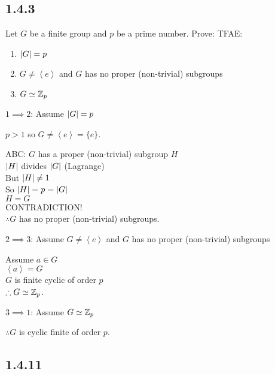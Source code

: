 \documentclass[letterpaper,12pt,fleqn]{article}
\newcommand{\cycle}[1]{\left<#1\right>}
\begin{document}
\subsection*{1.4.3}
Let $G$ be a finite group and $p$ be a prime number.
Prove: TFAE:
\begin{enumerate}
\item $\lvert G\rvert=p$
\item $G\ne\cycle{e}$ and $G$ has no proper (non-trivial) subgroups
\item $G\simeq\mathbb{Z}_p$
\end{enumerate}

\bigskip

\begin{description}
\item{$1\implies2$}: Assume $\lvert G\rvert=p$

  $p>1$ so $G\ne\cycle{e}=\{e\}$.

  ABC: $G$ has a proper (non-trivial) subgroup $H$ \\
  $\lvert H\rvert$ divides $\lvert G\rvert$ (Lagrange) \\
  But $\lvert H\rvert\ne1$ \\
  So $\lvert H\rvert=p=\lvert G\rvert$ \\
  $H=G$ \\
  CONTRADICTION! \\
  $\therefore G$ has no proper (non-trivial) subgroups.

\item{$2\implies3$}: Assume $G\ne\cycle{e}$ and $G$ has no proper
  (non-trivial) subgroups

  Assume $a\in G$ \\
  $\cycle{a}=G$ \\
  $G$ is finite cyclic of order $p$ \\
  $\therefore G\simeq\mathbb{Z}_p$.

\item{$3\implies1$}: Assume $G\simeq\mathbb{Z}_p$

  $\therefore G$ is cyclic finite of order $p$.
\end{description}

\subsection*{1.4.11}
\end{document}
